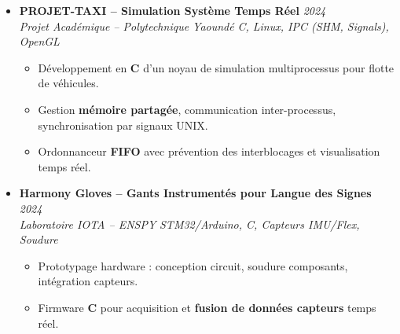 \documentclass[a4paper,11pt]{article}
\begin{document}
\begin{itemize}[leftmargin=*, label={-}]
\item \textbf{PROJET-TAXI -- Simulation Système Temps Réel} \hfill \textit{2024} \\
\textit{Projet Académique -- Polytechnique Yaoundé} \hfill \textit{C, Linux, IPC (SHM, Signals), OpenGL}
\vspace{-2pt}
    \begin{itemize}[leftmargin=0.4cm, nosep, label=\tiny$\bullet$]
        \item \small{Développement en \textbf{C} d'un noyau de simulation multiprocessus pour flotte de véhicules.}
        \item \small{Gestion \textbf{mémoire partagée}, communication inter-processus, synchronisation par signaux UNIX.}
        \item \small{Ordonnanceur \textbf{FIFO} avec prévention des interblocages et visualisation temps réel.}
    \end{itemize}
\vspace{3pt}

\item \textbf{Harmony Gloves -- Gants Instrumentés pour Langue des Signes} \hfill \textit{2024} \\
\textit{Laboratoire IOTA -- ENSPY} \hfill \textit{STM32/Arduino, C, Capteurs IMU/Flex, Soudure}
\vspace{-2pt}
    \begin{itemize}[leftmargin=0.4cm, nosep, label=\tiny$\bullet$]
        \item \small{Prototypage hardware : conception circuit, soudure composants, intégration capteurs.}
        \item \small{Firmware \textbf{C} pour acquisition et \textbf{fusion de données capteurs} temps réel.}
    \end{itemize}

\end{itemize}

\end{document}

